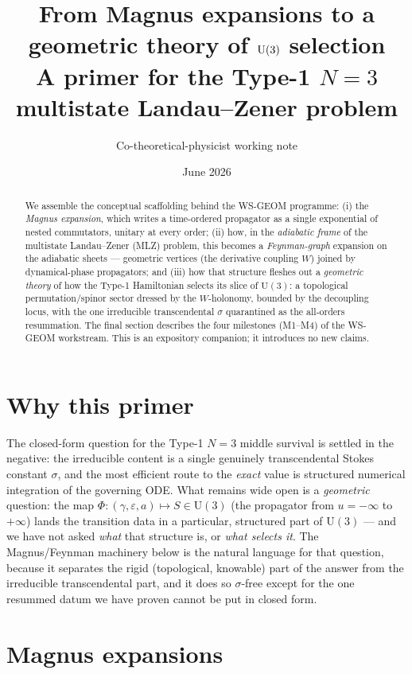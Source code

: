 \documentclass[11pt]{article}
\title{\textbf{From Magnus expansions to a geometric theory of $\U(3)$ selection}\\[2pt]
\large A primer for the Type-1 $N{=}3$ multistate Landau--Zener problem}
\author{Co-theoretical-physicist working note}
\date{June 2026}
\newcommand{\eps}{\varepsilon}
\newcommand{\U}{\mathrm{U}}
\begin{document}
\maketitle
\begin{abstract}
We assemble the conceptual scaffolding behind the WS-GEOM programme: (i) the \emph{Magnus expansion},
which writes a time-ordered propagator as a single exponential of nested commutators, unitary at every
order; (ii) how, in the \emph{adiabatic frame} of the multistate Landau--Zener (MLZ) problem, this becomes
a \emph{Feynman-graph} expansion on the adiabatic sheets --- geometric vertices (the derivative coupling
$W$) joined by dynamical-phase propagators; and (iii) how that structure fleshes out a \emph{geometric
theory} of how the Type-1 Hamiltonian selects its slice of $\U(3)$: a topological permutation/spinor
sector dressed by the $W$-holonomy, bounded by the decoupling locus, with the one irreducible transcendental
$\sigma$ quarantined as the all-orders resummation. The final section describes the four milestones
(M1--M4) of the WS-GEOM workstream. This is an expository companion; it introduces no new claims.
\end{abstract}

\tableofcontents

\section{Why this primer}
The closed-form question for the Type-1 $N{=}3$ middle survival is settled in the negative: the irreducible
content is a single genuinely transcendental Stokes constant $\sigma$, and the most efficient route to the
\emph{exact} value is structured numerical integration of the governing ODE. What remains wide open is a
\emph{geometric} question: the map $\Phi:(\gamma,\eps,a)\mapsto S\in\U(3)$ (the propagator from $u=-\infty$
to $+\infty$) lands the transition data in a particular, structured part of $\U(3)$ --- and we have not
asked \emph{what} that structure is, or \emph{what selects it}. The Magnus/Feynman machinery below is the
natural language for that question, because it separates the rigid (topological, knowable) part of the
answer from the irreducible transcendental part, and it does so $\sigma$-free except for the one resummed
datum we have proven cannot be put in closed form.

\section{Magnus expansions}\label{sec:magnus}
\end{document}
